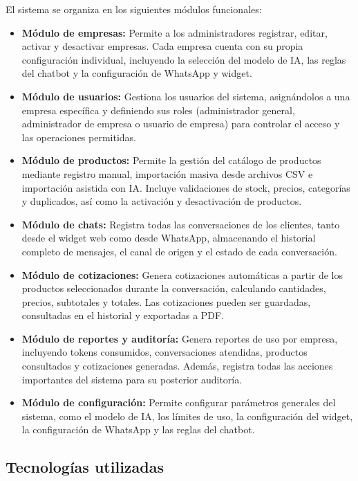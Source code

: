 El sistema se organiza en los siguientes módulos funcionales:

\begin{itemize}
    \item \textbf{Módulo de empresas:} Permite a los administradores registrar, editar, activar y desactivar empresas. Cada empresa cuenta con su propia configuración individual, incluyendo la selección del modelo de IA, las reglas del chatbot y la configuración de WhatsApp y widget.
    \item \textbf{Módulo de usuarios:} Gestiona los usuarios del sistema, asignándolos a una empresa específica y definiendo sus roles (administrador general, administrador de empresa o usuario de empresa) para controlar el acceso y las operaciones permitidas.
    \item \textbf{Módulo de productos:} Permite la gestión del catálogo de productos mediante registro manual, importación masiva desde archivos CSV e importación asistida con IA. Incluye validaciones de stock, precios, categorías y duplicados, así como la activación y desactivación de productos.
    \item \textbf{Módulo de chats:} Registra todas las conversaciones de los clientes, tanto desde el widget web como desde WhatsApp, almacenando el historial completo de mensajes, el canal de origen y el estado de cada conversación.
    \item \textbf{Módulo de cotizaciones:} Genera cotizaciones automáticas a partir de los productos seleccionados durante la conversación, calculando cantidades, precios, subtotales y totales. Las cotizaciones pueden ser guardadas, consultadas en el historial y exportadas a PDF.
    \item \textbf{Módulo de reportes y auditoría:} Genera reportes de uso por empresa, incluyendo tokens consumidos, conversaciones atendidas, productos consultados y cotizaciones generadas. Además, registra todas las acciones importantes del sistema para su posterior auditoría.
    \item \textbf{Módulo de configuración:} Permite configurar parámetros generales del sistema, como el modelo de IA, los límites de uso, la configuración del widget, la configuración de WhatsApp y las reglas del chatbot.
\end{itemize}

\subsection{Tecnologías utilizadas}
\label{sec:tecnologias}

